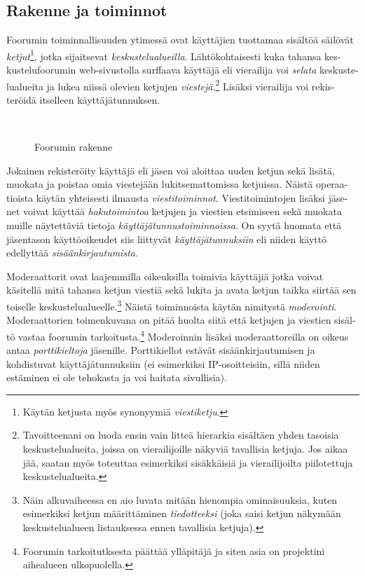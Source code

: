 \documentclass[11pt]{article}
\begin{document}
	\newpage
	\thispagestyle{plain}
	\subsection{Rakenne ja toiminnot}
		Foorumin toiminnallisuuden ytimessä ovat käyttäjien tuottamaa sisältöä säilövät
		\emph{ketjut}\footnote{Käytän ketjusta myös synonyymiä \emph{viestiketju}.}, jotka
		sijaitsevat \emph{keskustelualueilla}. Lähtökohtaisesti kuka tahansa kes-kustelufoorumin web-sivustolla
		surffaava käyttäjä eli vierailija voi \emph{selata} keskuste-lualueita ja lukea niissä olevien ketjujen
		\emph{viestejä}.\footnote{
		Tavoitteenani on luoda ensin vain litteä hierarkia sisältäen yhden tasoisia keskustelualueita,
		joissa on vierailijoille näkyviä tavallisia ketjuja. Jos aikaa jää, saatan myös toteuttaa esimerkiksi
		sisäkkäisiä ja vierailijoilta piilotettuja keskustelualueita.}
		Lisäksi vierailija voi rekis-teröidä itselleen käyttäjätunnuksen.	
	
		\begin{figure}[H]
			\centering
			\\
			\caption{Foorumin rakenne}
		\end{figure}
	
		Jokainen rekisteröity käyttäjä eli jäsen voi aloittaa uuden ketjun sekä lisätä, muokata ja poistaa
		omia viestejään lukitsemattomissa ketjuissa. Näistä operaa-tioista käytän yhteisesti ilmausta
		\emph{viestitoiminnot}. Viestitoimintojen lisäksi jäse-net voivat käyttää \emph{hakutoimintoa}
		ketjujen ja viestien etsimiseen sekä muokata muille näytettäviä tietoja \emph{käyttäjätunnustoiminnoissa}. On syytä huomata että jäsentason käyttöoikeudet siis liittyvät
		\emph{käyttäjätunnuksiin} eli niiden käyttö edellyttää \emph{sisäänkirjautumista}.
	
		Moderaattorit ovat laajemmilla oikeuksilla toimivia
		käyttäjiä jotka voivat käsitellä mitä tahansa ketjun viestiä sekä lukita ja avata ketjun taikka siirtää
		sen toiselle keskustelualueelle.\footnote{Näin alkuvaiheessa en aio luvata mitään hienompia
		ominaisuuksia, kuten esimerkiksi ketjun määrittäminen \emph{tiedotteeksi} (joka saisi ketjun näkymään
		keskustelualueen listauksessa ennen tavallisia ketjuja).}
		Näistä toiminnoista käytän nimitystä \emph{moderointi}.
		\newpage
		\thispagestyle{plain}
		\noindent
		Moderaattorien toimenkuvana on pitää huolta siitä että ketjujen ja viestien sisäl-tö vastaa foorumin
		tarkoitusta.\footnote{Foorumin tarkoitutksesta päättää ylläpitäjä ja siten asia on projektini
		aihealueen ulkopuolella.}
		Moderoinnin lisäksi moderaattoreilla on oikeus antaa \emph{porttikieltoja} jäsenille. Porttikiellot
		estävät sisäänkirjautumisen ja kohdistuvat käyttäjätunnuksiin (ei esimerkiksi IP-osoitteisiin, sillä
		niiden estäminen ei ole tehokasta ja voi haitata sivullisia).
	
\end{document}
